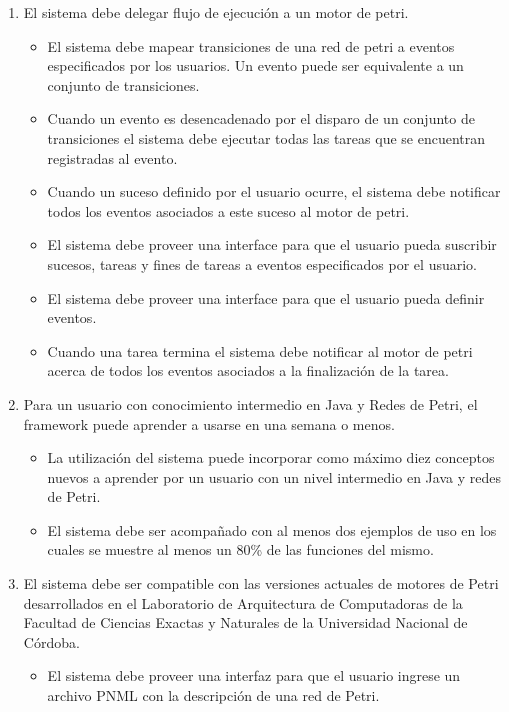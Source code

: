\begin{enumerate}
	\item El sistema debe delegar flujo de ejecución a un motor de
	petri.
	\begin{itemize}
		\item El sistema debe mapear transiciones de una red de petri a eventos
		especificados por los usuarios. Un evento puede ser equivalente a un conjunto de transiciones.
		\item Cuando un evento es desencadenado por el disparo de un conjunto de
		transiciones el sistema debe ejecutar todas las tareas que se encuentran registradas al evento.
		\item Cuando un suceso definido por el usuario ocurre, el sistema debe
		notificar todos los eventos asociados a este suceso al motor de petri.
		\item El sistema debe proveer una interface para que el usuario pueda
		suscribir sucesos, tareas y fines de tareas a eventos especificados por el usuario.
		\item El sistema debe proveer una interface para que el usuario pueda definir
		eventos.
		\item Cuando una tarea termina el sistema debe notificar al motor de petri
		acerca de todos los eventos asociados a la finalización de la tarea.
	\end{itemize}
	\item Para un usuario con conocimiento intermedio en Java y Redes de Petri, el
	framework puede aprender a usarse en una semana o menos.
	\begin{itemize}
	    \item La utilización del sistema puede incorporar como máximo diez
	    conceptos nuevos a aprender por un usuario con un nivel intermedio en Java
	    y redes de Petri.
	    \item El sistema debe ser acompañado con al menos dos ejemplos de uso en
	    los cuales se muestre al menos un 80\% de las funciones del mismo.
	\end{itemize}
	\item El sistema debe ser compatible con las versiones actuales de motores de
	Petri desarrollados en el Laboratorio de Arquitectura de Computadoras de la
	Facultad de Ciencias Exactas y Naturales de la Universidad Nacional de Córdoba.
	\begin{itemize}
	    \item El sistema debe proveer una interfaz para que el usuario ingrese un
	    archivo PNML con la descripción de una red de Petri.

\end{itemize}
\end{enumerate}
